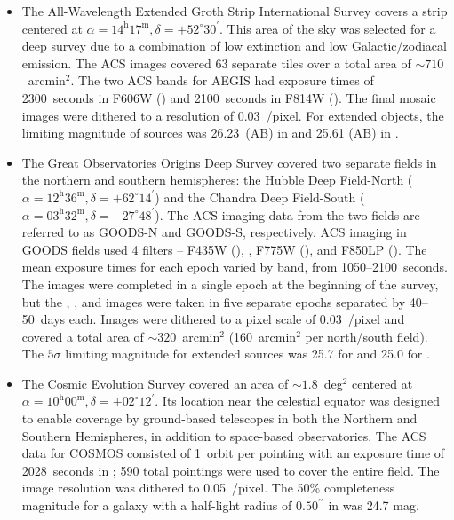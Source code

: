 \documentclass[twocolumn]{aastex6}
\begin{document}
\begin{itemize}

\item The All-Wavelength Extended Groth Strip International Survey
    \citep[AEGIS;][]{dav07} covers a strip centered at
    $\alpha=14^\textrm{h}17^\textrm{m}, \delta=+52^\circ30^\prime$. This area
    of the sky was selected for a deep survey due to a combination of low
    extinction and low Galactic/zodiacal emission. The ACS images covered 63
    separate tiles over a total area of $\sim710$~arcmin$^2$. The two ACS bands
    for AEGIS had exposure times of 2300~seconds in F606W (\Vband) and
    2100~seconds in F814W (\Iband). The final mosaic images were dithered
    to a resolution of 0.03~\arcsec/pixel. For extended objects, the
    limiting magnitude of sources was 26.23~(AB) in \Vband{} and 25.61 (AB) in
    \Iband. 

\item The Great Observatories Origins Deep Survey \citep[GOODS;][]{gia04}
    covered two separate fields in the northern and southern hemispheres: the Hubble
    Deep Field-North ($\alpha=12^\textrm{h}36^\textrm{m},
    \delta=+62^\circ14^\prime$) and the Chandra Deep Field-South
    ($\alpha=03^\textrm{h}32^\textrm{m}, \delta=-27^\circ48^\prime$). The \hst{}
    ACS imaging data from the two fields are referred to as GOODS-N and GOODS-S,
    respectively. ACS imaging in GOODS fields used 4 filters -- F435W (\Bband),
    \Vband, F775W (\iband), and F850LP (\zband). The mean exposure times for each
    epoch varied by band, from 1050--2100~seconds. The \Bband{} images were completed
    in a single epoch at the beginning of the survey, but the \Vband, \iband, and
    \zband{} images were taken in five separate epochs separated by 40--50~days
    each. Images were dithered to a pixel scale of 0.03~\arcsec/pixel and covered a
    total area of $\sim320$~arcmin$^2$ (160~arcmin$^2$ per north/south field). The
    $5\sigma$ limiting magnitude for extended sources was 25.7 for \Vband{} and
    25.0 for \iband. 

\item The Cosmic Evolution Survey \citep[COSMOS;][]{sco07} covered an area of
    $\sim1.8$~deg$^2$ centered at $\alpha=10^\textrm{h}00^\textrm{m},
    \delta=+02^\circ12^\prime$. Its location near the celestial equator was
    designed to enable coverage by ground-based telescopes in both the Northern and
    Southern Hemispheres, in addition to space-based observatories. The ACS data
    for COSMOS consisted of 1~orbit per pointing with an exposure time of
    2028~seconds in \Iband; 590 total pointings were used to cover the entire
    field. The image resolution was dithered to 0.05~\arcsec/pixel. The 50\%
    completeness magnitude for a galaxy with a half-light radius of
    $0.50^{\prime\prime}$ in \Iband{} was 24.7 mag. 


\end{itemize}
\end{document}

